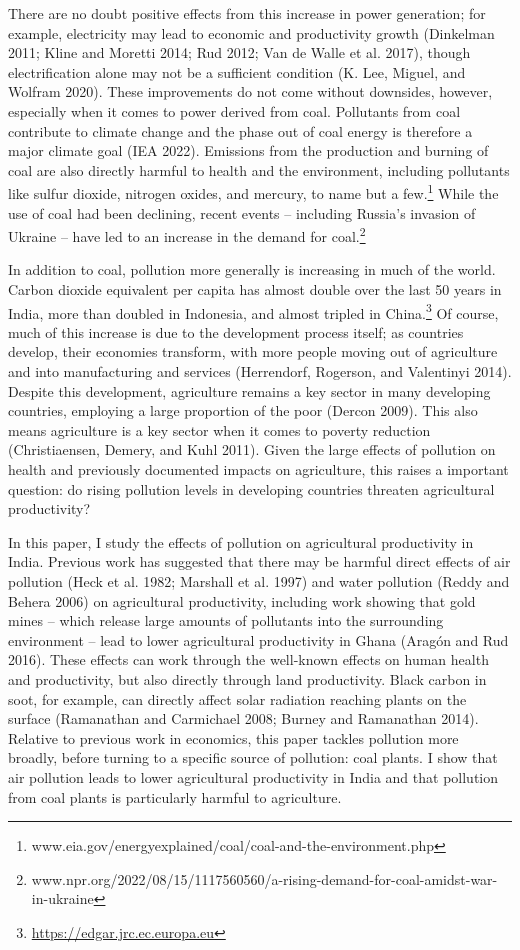 \documentclass[
]{article}
\begin{document}
There are no doubt positive effects from this increase in power generation; for example, electricity may lead to economic and productivity growth (Dinkelman 2011; Kline and Moretti 2014; Rud 2012; Van de Walle et al. 2017), though electrification alone may not be a sufficient condition (K. Lee, Miguel, and Wolfram 2020). These improvements do not come without downsides, however, especially when it comes to power derived from coal. Pollutants from coal contribute to climate change and the phase out of coal energy is therefore a major climate goal (IEA 2022). Emissions from the production and burning of coal are also directly harmful to health and the environment, including pollutants like sulfur dioxide, nitrogen oxides, and mercury, to name but a few.\footnote{www.eia.gov/energyexplained/coal/coal-and-the-environment.php} While the use of coal had been declining, recent events -- including Russia's invasion of Ukraine -- have led to an increase in the demand for coal.\footnote{www.npr.org/2022/08/15/1117560560/a-rising-demand-for-coal-amidst-war-in-ukraine}

In addition to coal, pollution more generally is increasing in much of the world. Carbon dioxide equivalent per capita has almost double over the last 50 years in India, more than doubled in Indonesia, and almost tripled in China.\footnote{\url{https://edgar.jrc.ec.europa.eu}} Of course, much of this increase is due to the development process itself; as countries develop, their economies transform, with more people moving out of agriculture and into manufacturing and services (Herrendorf, Rogerson, and Valentinyi 2014). Despite this development, agriculture remains a key sector in many developing countries, employing a large proportion of the poor (Dercon 2009). This also means agriculture is a key sector when it comes to poverty reduction (Christiaensen, Demery, and Kuhl 2011). Given the large effects of pollution on health and previously documented impacts on agriculture, this raises a important question: do rising pollution levels in developing countries threaten agricultural productivity?

In this paper, I study the effects of pollution on agricultural productivity in India. Previous work has suggested that there may be harmful direct effects of air pollution (Heck et al. 1982; Marshall et al. 1997) and water pollution (Reddy and Behera 2006) on agricultural productivity, including work showing that gold mines -- which release large amounts of pollutants into the surrounding environment -- lead to lower agricultural productivity in Ghana (Aragón and Rud 2016). These effects can work through the well-known effects on human health and productivity, but also directly through land productivity. Black carbon in soot, for example, can directly affect solar radiation reaching plants on the surface (Ramanathan and Carmichael 2008; Burney and Ramanathan 2014). Relative to previous work in economics, this paper tackles pollution more broadly, before turning to a specific source of pollution: coal plants. I show that air pollution leads to lower agricultural productivity in India and that pollution from coal plants is particularly harmful to agriculture.
\end{document}

